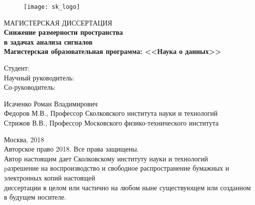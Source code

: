 \documentclass[12pt,oneside]{article}
\theoremstyle{definition}
\begin{document}
	\begin{figure}
		\vspace{1.7cm}
		\centering
		\texttt{[image: sk\_logo]}
	\end{figure}
	\begin{center}
		\sc 
			МАГИСТЕРСКАЯ ДИССЕРТАЦИЯ\\[5mm]
		\bf {\large
		Снижение размерности пространства \\в задачах анализа сигналов}\\[19mm]
		\rm
		Магистерская образовательная программа: <<Наука о данных>>\\[10mm]
	\end{center}
	\begin{minipage}{0.5\linewidth}
		\begin{flushright}
			Студент: \hphantom{1}\\[12mm]
			Научный руководитель: \hphantom{1}\\[12mm]
			Со-руководитель: \hphantom{1}\\
		\end{flushright}
	\end{minipage}%
	\begin{minipage}{0.48\linewidth}
		\vspace{.52cm}
		\begin{flushleft}
			Исаченко Роман Владимирович\\[12mm]
			Федоров М.В., Профессор Сколковского института науки и технологий\\[6.8mm]
			Стрижов В.В., Профессор Московского физико-технического института\\
		\end{flushleft}
	\end{minipage}%
	
	\vfill
	\begin{center}
		Москва, 2018 \\[9mm]
		\scriptsize{
			Авторское право 2018. Все права защищены. \\[7mm]
			
			Автор настоящим дает Сколковскому институту науки и технологий \\
			pазрешение на воспроизводство и свободное распространение бумажных и электронных копий настоящей \\ диссертации в целом или частично на любом ныне существующем или созданном в будущем носителе. \\[12mm]}
	\end{center}
\end{document}
